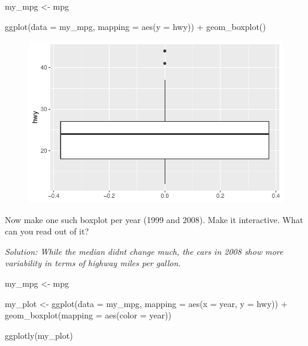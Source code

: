 \documentclass[
  letterpaper,
  DIV=11,
  numbers=noendperiod]{scrartcl}
\newenvironment{Shaded}{\begin{snugshade}}{\end{snugshade}}
\newcommand{\AttributeTok}[1]{\textcolor[rgb]{0.40,0.45,0.13}{#1}}
\newcommand{\FunctionTok}[1]{\textcolor[rgb]{0.28,0.35,0.67}{#1}}
\newcommand{\NormalTok}[1]{\textcolor[rgb]{0.00,0.23,0.31}{#1}}
\newcommand{\OtherTok}[1]{\textcolor[rgb]{0.00,0.23,0.31}{#1}}
\newcommand{\SpecialCharTok}[1]{\textcolor[rgb]{0.37,0.37,0.37}{#1}}
\begin{document}
\begin{Shaded}
\begin{Highlighting}[]
\NormalTok{my\_mpg }\OtherTok{\textless{}{-}}\NormalTok{ mpg}

\FunctionTok{ggplot}\NormalTok{(}\AttributeTok{data =}\NormalTok{ my\_mpg, }
       \AttributeTok{mapping =} \FunctionTok{aes}\NormalTok{(}\AttributeTok{y =}\NormalTok{ hwy)) }\SpecialCharTok{+}
  \FunctionTok{geom\_boxplot}\NormalTok{() }
\end{Highlighting}
\end{Shaded}

\begin{figure}[H]

{\centering \includegraphics{Part1_Lecture1_Ex_files/figure-pdf/unnamed-chunk-34-1.pdf}

}

\end{figure}

Now make one such boxplot per year (1999 and 2008). Make it interactive.
What can you read out of it?

\emph{Solution: While the median didnt change much, the cars in 2008
show more variability in terms of highway miles per gallon.}

\begin{Shaded}
\begin{Highlighting}[]
\NormalTok{my\_mpg }\OtherTok{\textless{}{-}}\NormalTok{ mpg}

\NormalTok{my\_plot }\OtherTok{\textless{}{-}} \FunctionTok{ggplot}\NormalTok{(}\AttributeTok{data =}\NormalTok{ my\_mpg, }
       \AttributeTok{mapping =} \FunctionTok{aes}\NormalTok{(}\AttributeTok{x =}\NormalTok{ year, }
                     \AttributeTok{y =}\NormalTok{ hwy)) }\SpecialCharTok{+}
  \FunctionTok{geom\_boxplot}\NormalTok{(}\AttributeTok{mapping =} \FunctionTok{aes}\NormalTok{(}\AttributeTok{color =}\NormalTok{ year)) }

\FunctionTok{ggplotly}\NormalTok{(my\_plot)}
\end{Highlighting}
\end{Shaded}
\end{document}
